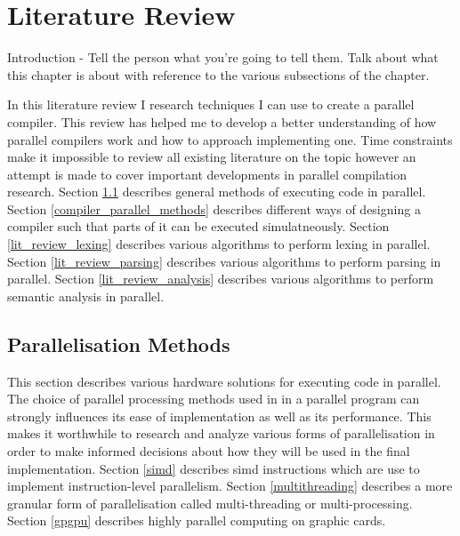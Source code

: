 \chapter{Literature Review} \label{litreview}
\begin{sectionplan}
Introduction - Tell the person what you're going to tell them. Talk about what
this chapter is about with reference to the various subsections of the chapter.
\end{sectionplan}

In this literature review I research techniques I can use to create a parallel
compiler. This review has helped me to develop a better understanding of how
parallel compilers work and how to approach implementing one. Time constraints
make it impossible to review all existing literature on the topic however
an attempt is made to cover important developments in parallel compilation
research.
\newline \newline
Section \ref{parallelisation_methods} describes general methods of executing
code in parallel.
\newline \newline
Section \ref{compiler_parallel_methods} describes different ways of designing a compiler
such that parts of it can be executed simulatneously.
\newline \newline
Section \ref{lit_review_lexing} describes various algorithms to perform lexing
in parallel. 
\newline \newline
Section \ref{lit_review_parsing} describes various algorithms to perform parsing
in parallel.
\newline \newline
Section \ref{lit_review_analysis} describes various algorithms to perform semantic
analysis in parallel.
\newline \newline

\section{Parallelisation Methods} \label{parallelisation_methods}
This section describes various hardware solutions for executing code in
parallel. The choice of parallel processing methods used in in a parallel
program can strongly influences its ease of implementation as well as its
performance. This makes it worthwhile to research and analyze various forms of
parallelisation in order to make informed decisions about how they will be used
in the final implementation.
\newline \newline
Section \ref{simd} describes \gls{simd} instructions which are use to  implement
instruction-level parallelism.
\newline \newline
Section \ref{multithreading} describes a more granular form of parallelisation
called multi-threading or multi-processing.
\newline \newline
Section \ref{gpgpu} describes highly parallel computing on graphic cards.

